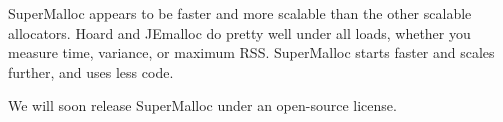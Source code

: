 \documentclass[pldi]{sigplanconf-pldi15}
\begin{document}



SuperMalloc appears to be faster and more scalable than the other
scalable allocators.  Hoard and JEmalloc do pretty well under all
loads, whether you measure time, variance, or maximum RSS.
SuperMalloc starts faster and scales further, and uses less code.

We will soon release SuperMalloc under an open-source license.

{\raggedright


}

\end{document}

